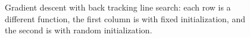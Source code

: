 \begin{figure}[h!tbp]
       \caption{Gradient descent with back tracking line search: each row is a different
       function, the first column is with fixed initialization, and the second is with 
       random initialization.}
\end{figure}


